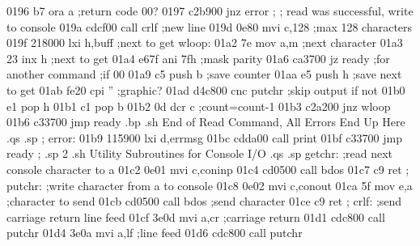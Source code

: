 0196 b7                           ora    a         ;return code 00?
0197 c2b900                       jnz    error
                         ;
                         ;        read was successful, write to console
019a cdcf00                       call   crlf      ;new line
019d 0e80                         mvi    c,128     ;max 128 characters
019f 218000                       lxi    h,buff    ;next to get
                         wloop:
01a2 7e                           mov    a,m       ;next character
01a3 23                           inx    h         ;next to get
01a4 e67f                         ani    7fh       ;mask parity
01a6 ca3700                       jz     ready     ;for another command
                                                   ;if 00
01a9 c5                           push   b         ;save counter
01aa e5                           push   h         ;save next to get
01ab fe20                         cpi    ''        ;graphic?
01ad d4c800                       cnc    putchr    ;skip output if not
01b0 e1                           pop    h
01b1 c1                           pop    b
01b2 0d                           dcr    c         ;count=count-1
01b3 c2a200                       jnz    wloop
01b6 c33700                       jmp    ready
.bp
.sh
                          End of Read Command, All Errors End Up Here
.qs
.sp
                         ;
                         error:
01b9 115900                       lxi    d,errmsg
01bc cdda00                       call   print
01bf c33700                       jmp    ready
                         ;
.sp 2
.sh
                          Utility Subroutines for Console I/O
.qs
.sp
                         getchr:
                                  ;read next console character to a
01c2 0e01                         mvi    c,coninp
01c4 cd0500                       call   bdos
01c7 c9                           ret
                         ;
                         putchr:
                                  ;write character from a to console
01c8 0e02                         mvi    c,conout
01ca 5f                           mov    e,a       ;character to send
01cb cd0500                       call   bdos      ;send character
01ce c9                           ret
                         ;
                         crlf:
                                  ;send carriage return line feed
01cf 3e0d                         mvi    a,cr      ;carriage return
01d1 cdc800                       call   putchr
01d4 3e0a                         mvi    a,lf      ;line feed
01d6 cdc800                       call   putchr
